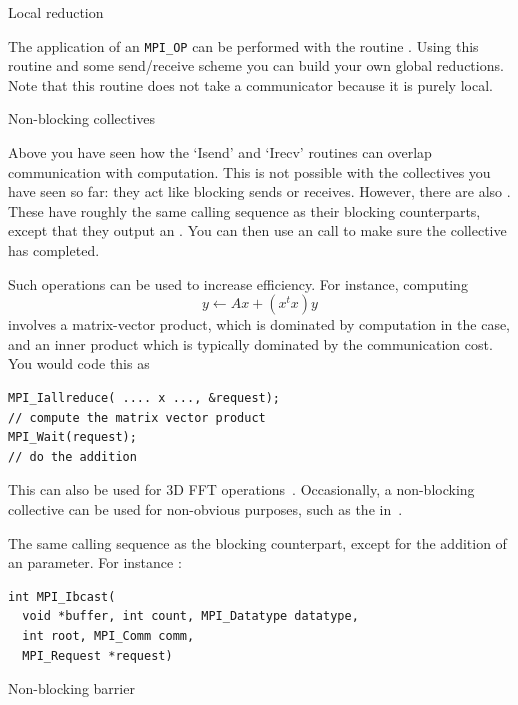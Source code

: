  {Local reduction}

The application of an \lstinline$MPI_OP$ can be performed with the routine
. Using this routine and some
send/receive scheme you can build your own global reductions. Note
that this routine does not take a communicator because it is purely local.



 {Non-blocking collectives}
\label{sec:mpi3collect}

Above you have seen how the `Isend' and `Irecv' routines can overlap communication
with computation. This is not possible with the collectives you have seen so far:
they act like blocking sends or receives.
However, there are also .
These have roughly the same calling sequence as their blocking counterparts,
except that they output an . You
can then use an  call to make sure the collective
has completed.

Such operations can be used to increase efficiency.
For instance, computing
\[ y \leftarrow Ax + (x^tx)y \]
involves a matrix-vector product, which is dominated by computation
in the  case, and an inner product which is 
typically dominated by the communication cost. You would code this as
\begin{lstlisting}
MPI_Iallreduce( .... x ..., &request);
// compute the matrix vector product
MPI_Wait(request);
// do the addition
\end{lstlisting}

This can also be used for 3D FFT operations~\cite{Hoefler:case-for-nbc}.
Occasionally, a non-blocking collective can be used for non-obvious purposes,
such as the  in~\cite{Hoefler:2010:SCP}.

The same calling sequence as the blocking counterpart, except for the addition
of an  parameter. For instance 
:
\begin{lstlisting}
int MPI_Ibcast(
  void *buffer, int count, MPI_Datatype datatype,
  int root, MPI_Comm comm, 
  MPI_Request *request)
\end{lstlisting}



 {Non-blocking barrier}
\label{sec:ibarrier}

